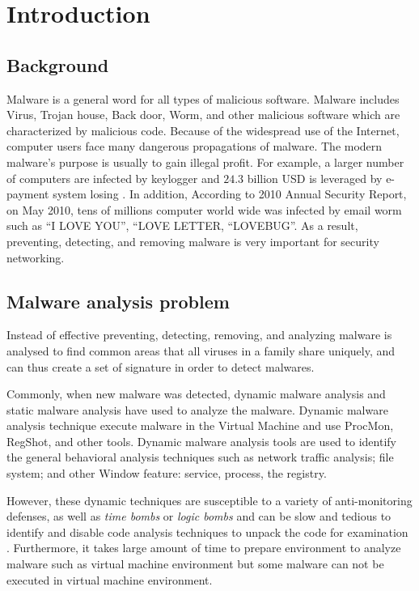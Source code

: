 \chapter{Introduction}\label{chap:1}

%
%
\section{Background}
Malware is a general word for all types of malicious software. Malware includes Virus, Trojan house, Back door, Worm, and other malicious software which are characterized by malicious code.
Because of the widespread use of the Internet, computer users face many dangerous propagations of malware. The modern malware's purpose is usually to gain illegal profit. For example, a larger number of computers are infected by keylogger and $24.3$ billion USD is leveraged  by e-payment system losing \cite{keylogger}. In addition, According to 2010 Annual Security Report, on May 2010, tens of millions computer world wide was infected by email worm such as “I LOVE YOU”, “LOVE LETTER, “LOVEBUG”\cite{Symantec}. As a result, preventing, detecting, and removing malware is very important for security networking.
\section{Malware analysis problem}
Instead of effective preventing, detecting, removing, and analyzing malware is analysed to find common areas that all viruses in a family share uniquely, and can thus create a set of signature in order to detect malwares.

Commonly, when new malware was detected, dynamic malware analysis and static malware analysis have used to analyze the malware.  Dynamic malware analysis technique execute malware in the Virtual Machine and use ProcMon, RegShot, and other tools. Dynamic malware analysis tools are used to identify the general behavioral analysis techniques such as network traffic analysis; file system; and other Window feature: service, process, the registry.

However, these dynamic techniques are susceptible to a variety of anti-monitoring defenses, as well as \emph{time bombs} or \emph{logic bombs} and can be slow and tedious to identify and disable code analysis techniques to unpack the code for examination \cite{georg}. Furthermore, it takes large amount of time to prepare environment to analyze malware such as virtual machine environment but some malware can not be executed in virtual machine environment.

